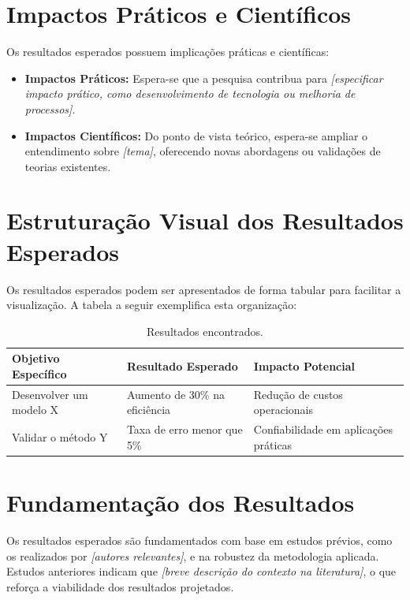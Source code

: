 \section{Impactos Práticos e Científicos}

Os resultados esperados possuem implicações práticas e científicas:
\begin{itemize}
    \item \textbf{Impactos Práticos:} Espera-se que a pesquisa contribua para \textit{[especificar impacto prático, como desenvolvimento de tecnologia ou melhoria de processos]}.
    \item \textbf{Impactos Científicos:} Do ponto de vista teórico, espera-se ampliar o entendimento sobre \textit{[tema]}, oferecendo novas abordagens ou validações de teorias existentes.
\end{itemize}

\section{Estruturação Visual dos Resultados Esperados}

Os resultados esperados podem ser apresentados de forma tabular para facilitar a visualização. A tabela a seguir exemplifica esta organização:

\begin{table}[htb]
  \renewcommand{\arraystretch}{1.5}
  \ABNTEXfontereduzida
  \caption[Resultados encontrados]{Resultados encontrados.}
  \label{tab-nivinv}
  \begin{tabular}{p{4cm} p{5cm} p{6cm}}
    \hline
     \textbf{Objetivo Específico} & \textbf{Resultado Esperado}  & \textbf{Impacto Potencial}  \\
      \hline
      Desenvolver um modelo X & Aumento de 30\% na eficiência & Redução de custos operacionais \\ \hline
        Validar o método Y & Taxa de erro menor que 5\% & Confiabilidade em aplicações práticas \\
      \hline
  \end{tabular}
\end{table}


\section{Fundamentação dos Resultados}

Os resultados esperados são fundamentados com base em estudos prévios, como os realizados por \textit{[autores relevantes]}, e na robustez da metodologia aplicada. Estudos anteriores indicam que \textit{[breve descrição do contexto na literatura]}, o que reforça a viabilidade dos resultados projetados.

